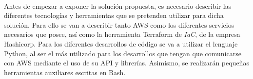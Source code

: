 \documentclass[../../memoria.tex]{subfiles}
\begin{document}
\paragraph{}
Antes de empezar a exponer la solución propuesta, es necesario describir las diferentes tecnologías y herramientas que se pretenden utilizar para dicha solución. Para ello se van a describir tanto AWS como los diferentes servicios necesarios que posee, así como la herramienta Terraform de \textit{IaC}, de la empresa Hashicorp. Para los diferentes desarrollos de código se va a utilizar el lenguaje Python, al ser el más utilizado para los desarrollos que tengan que comunicarse con AWS mediante el uso de su API y librerías. Asimismo, se realizarán pequeñas herramientas auxiliares escritas en Bash.
\end{document}
